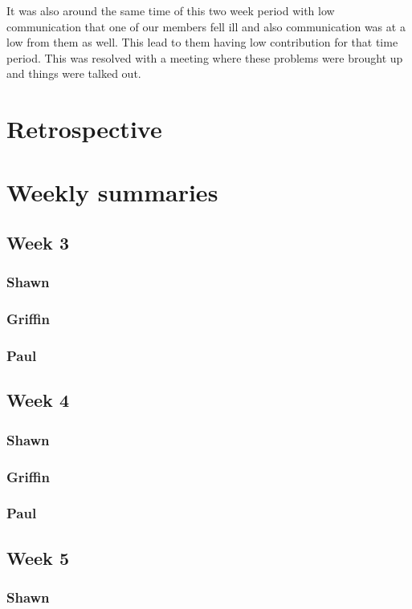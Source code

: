 \documentclass[10pt,draftclsnofoot,onecolumn]{IEEEtran}
\begin{document}
It was also around the same time of this two week period with low communication that one of our members fell ill and also communication was at a low from them as well. This lead to them having low contribution for that time period. This was resolved with a meeting where these problems were brought up and things were talked out.
\section{Retrospective}

\section{Weekly summaries}
\subsection{Week 3}
\subsubsection{Shawn}
\subsubsection{Griffin}
\subsubsection{Paul}

\subsection{Week 4}
\subsubsection{Shawn}
\subsubsection{Griffin}
\subsubsection{Paul}

\subsection{Week 5}
\subsubsection{Shawn}
\end{document}
